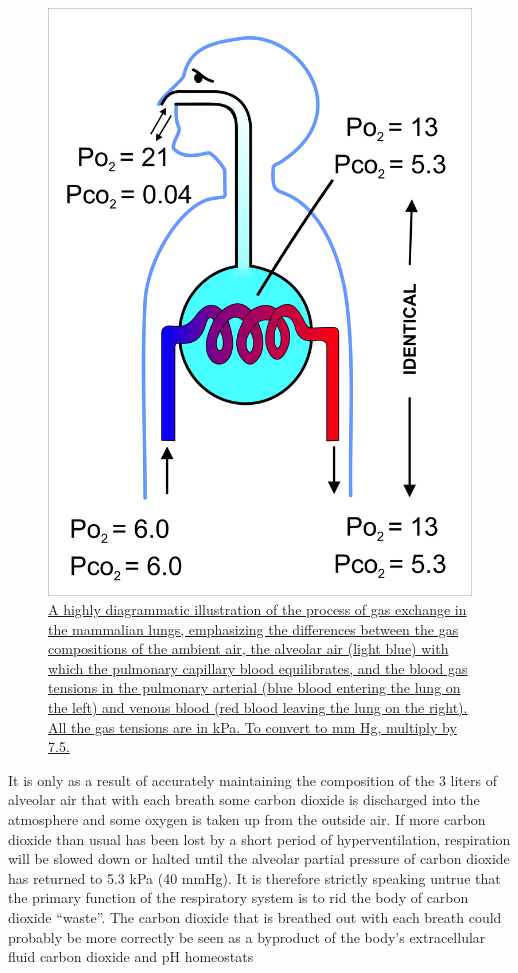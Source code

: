 \begin{figure}

{\centering \includegraphics[width=0.7\linewidth]{./figures/respiratory/Gas_exchange} 

}

\caption{\href{https://commons.wikimedia.org/wiki/File:Gas_exchange.jpg}{A highly diagrammatic illustration of the process of gas exchange in the mammalian lungs, emphasizing the differences between the gas compositions of the ambient air, the alveolar air (light blue) with which the pulmonary capillary blood equilibrates, and the blood gas tensions in the pulmonary arterial (blue blood entering the lung on the left) and venous blood (red blood leaving the lung on the right). All the gas tensions are in kPa. To convert to mm Hg, multiply by 7.5.}}\label{fig:gasexchange}
\end{figure}

It is only as a result of accurately maintaining the composition of the 3 liters of alveolar air that with each breath some carbon dioxide is discharged into the atmosphere and some oxygen is taken up from the outside air. If more carbon dioxide than usual has been lost by a short period of hyperventilation, respiration will be slowed down or halted until the alveolar partial pressure of carbon dioxide has returned to 5.3 kPa (40 mmHg). It is therefore strictly speaking untrue that the primary function of the respiratory system is to rid the body of carbon dioxide ``waste''. The carbon dioxide that is breathed out with each breath could probably be more correctly be seen as a byproduct of the body's extracellular fluid carbon dioxide and pH homeostats



